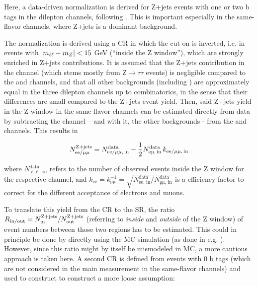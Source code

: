 Here, a data-driven normalization is derived for Z+jets events with one or two b tags in the dilepton channels, following . This is important especially in the same-flavor channels, where Z+jets is a dominant background.

The normalization is derived using a CR in which the cut on \mll is inverted, i.e. in events with $| m_{\ell\ell} - m_Z | < 15$ GeV (``inside the Z window''), which are strongly enriched in Z+jets contributions. It is assumed that the Z+jets contribution in the \emu channel (which stems mostly from $\mathrm{Z} \rightarrow \tau \tau$ events) is negligible compared to the \ee and \mumu channels, and that all other backgrounds (including \ttbar) are approximately equal in the three dilepton channels up to combinatorics, in the sense that their differences are small compared to the Z+jets event yield. Then, said Z+jets yield in the Z window in the same-flavor channels can be estimated directly from data by subtracting the \emu channel -- and with it, the other backgrounds - from the \ee and \mumu channels. This results in

\begin{equation}
\label{eq:ttxs:zjets_yield}
    N_{\mathrm{ee / \mu\mu}}^{\mathrm{Z+jets}} = N_{\mathrm{ee / \mu\mu,\,in}}^{\mathrm{data}} - \frac{1}{2} N_{\mathrm{\emu,\,in}}^{\mathrm{data}} \, k_{\mathrm{ee / \mu\mu,\,in}}
\end{equation}

\noindent where $N_{\mathrm{\ell \ell},\,in}^{\mathrm{data}}$ refers to the number of observed events inside the Z window for the respective channel, and $k_{\mathrm{ee}} = k_{\mathrm{\mu\mu}}^{-1} = \sqrt{N_{\mathrm{ee,\,in}}^{\mathrm{data}} / N_{\mathrm{\mu\mu,\,in}}^{\mathrm{data}}}$ is a efficiency factor to correct for the different acceptance of electrons and muons.

To translate this yield from the CR to the SR, the ratio $R_{\mathrm{in/out}} = N_{\mathrm{in}}^{\mathrm{Z+jets}} / N_{\mathrm{out}}^{\mathrm{Z+jets}}$ (referring to \textit{inside} and \textit{outside} of the Z window) of event numbers between those two regions has to be estimated. This could in principle be done by directly using the MC simulation (as done in e.g. ). However, since this ratio might by itself be mismodeled in MC, a more cautious approach is taken here. A second CR is defined from events with 0 b tags (which are not considered in the main measurement in the same-flavor channels) and used to construct to construct a more loose assumption:

